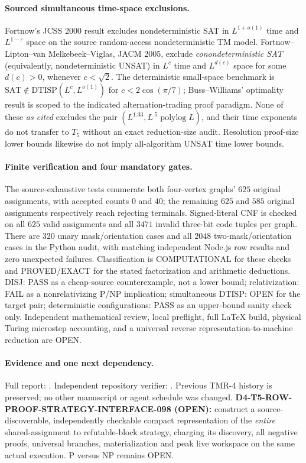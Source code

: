 \documentclass[11pt]{article}
\begin{document}
\paragraph{Sourced simultaneous time-space exclusions.}
Fortnow's JCSS 2000 result excludes nondeterministic SAT in
$L^{1+o(1)}$ time and $L^{1-\varepsilon}$ space on the source
random-access nondeterministic TM model.
Fortnow--Lipton--van Melkebeek--Viglas, JACM 2005, exclude
\emph{conondeterministic SAT} (equivalently, nondeterministic UNSAT)
in $L^c$ time and $L^{d(c)}$ space for some $d(c)>0$, whenever
$c<\sqrt2$. The deterministic small-space benchmark is
$\mathrm{SAT}\notin \mathrm{DTISP}(L^c,L^{o(1)})$
for $c<2\cos(\pi/7)$; Buss--Williams' optimality result is scoped
to the indicated alternation-trading proof paradigm.
None of these \emph{as cited} excludes the pair
$(L^{1.33},L^{.5}\operatorname{polylog}L)$, and their time exponents
do not transfer to $T_5$ without an exact reduction-size audit.
Resolution proof-size lower bounds likewise do not imply
all-algorithm UNSAT time lower bounds.

\paragraph{Finite verification and four mandatory gates.}
The source-exhaustive tests enumerate both four-vertex graphs'
$625$ original assignments, with accepted counts $0$ and $40$;
the remaining $625$ and $585$ original assignments respectively
reach rejecting terminals. Signed-literal CNF is checked on all
$625$ valid assignments and all $3471$ invalid three-bit code tuples
per graph. There are $320$ unary mask/orientation cases and all
$2048$ two-mask/orientation cases in the Python audit, with matching
independent Node.js row results and zero unexpected failures.
Classification is COMPUTATIONAL for these checks and PROVED/EXACT
for the stated factorization and arithmetic deductions.
DISJ: PASS as a cheap-source counterexample, not a lower bound;
relativization: FAIL as a nonrelativizing P/NP implication;
simultaneous DTISP: OPEN for the target pair;
deterministic configurations: PASS as an upper-bound sanity check only.
Independent mathematical review, local preflight, full LaTeX build,
physical Turing microstep accounting, and a universal reverse
representation-to-machine reduction are OPEN.

\paragraph{Evidence and one next dependency.}
Full report:
.
Independent repository verifier:
.
Previous TMR-4 history is preserved; no other manuscript or agent
schedule was changed.
\textbf{D4-T5-ROW-PROOF-STRATEGY-INTERFACE-098 (OPEN):}
construct a source-discoverable, independently checkable compact
representation of the \emph{entire} shared-assignment to refutable-block
strategy, charging its discovery, all negative proofs, universal branches,
materialization and peak live workspace on the same actual execution.
P versus NP remains OPEN.
\end{document}
